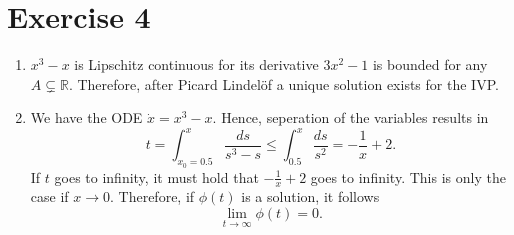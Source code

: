 \documentclass{article}
\theoremstyle{named}
\begin{document}
	\section*{Exercise 4}
	\begin{enumerate}[label=(\roman*)]
		\item $x^3-x$ is Lipschitz continuous for its derivative $3x^2-1$ is bounded for any $A \subsetneq \mathbb R$. Therefore, after Picard Lindelöf a unique solution exists for the IVP.
		
		\item We have the ODE $\dot x = x^3-x$. Hence, seperation of the variables results in
		\[
		t = \int^{x}_{x_0=0.5}\frac{ds}{s^3-s} \leq \int^{x}_{0.5}\frac{ds}{s^2} = -\frac{1}{x} + 2 .
		\]
		If $t$ goes to infinity, it must hold that $-\frac{1}{x} + 2$ goes to infinity. This is only the case if $x \to 0$. Therefore, if $\phi(t)$ is a solution, it follows
		\[
		\lim_{t \to \infty}\phi(t) = 0.
		\]
	\end{enumerate}
\end{document}
